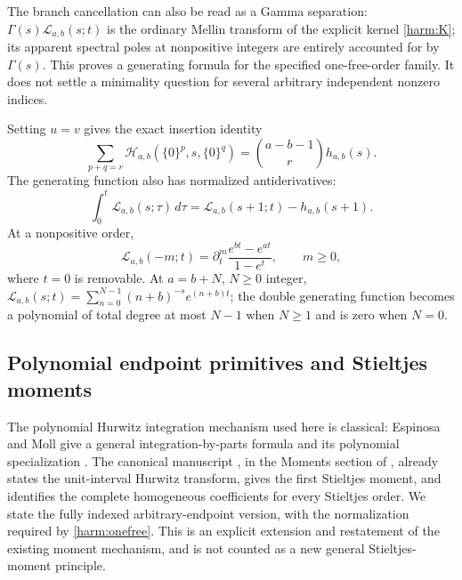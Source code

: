 The branch cancellation can also be read as a Gamma separation:
$\Gamma(s)\mathcal L_{a,b}(s;t)$ is the ordinary Mellin transform
of the explicit kernel \eqref{harm:K}; its apparent spectral poles at
nonpositive integers are entirely accounted for by $\Gamma(s)$.
This proves a generating formula for the specified one-free-order
family. It does not settle a minimality question for several arbitrary
independent nonzero indices.

Setting $u=v$ gives the exact insertion identity
\begin{equation}
 \sum_{p+q=r}\mathcal H_{a,b}(\{0\}^p,s,\{0\}^q)
                  =\binom{a-b-1}{r}h_{a,b}(s).
 \label{harm:diagonalzero}
\end{equation}
The generating function also has normalized antiderivatives:
\begin{equation}
 \int_0^t\mathcal L_{a,b}(s;\tau)\,d\tau
            =\mathcal L_{a,b}(s+1;t)-h_{a,b}(s+1).
 \label{harm:Lerchprimitive}
\end{equation}
At a nonpositive order,
\begin{equation}
 \mathcal L_{a,b}(-m;t)
      =\partial_t^m\frac{e^{bt}-e^{at}}{1-e^t},
 \qquad m\ge0,
 \label{harm:Lerchnegative}
\end{equation}
where $t=0$ is removable. At $a=b+N$, $N\ge0$ integer,
$\mathcal L_{a,b}(s;t)=\sum_{n=0}^{N-1}(n+b)^{-s}e^{(n+b)t}$;
the double generating function becomes a polynomial of total degree at
most $N-1$ when $N\ge1$ and is zero when $N=0$.

\subsection{Polynomial endpoint primitives and Stieltjes moments}

The polynomial Hurwitz integration mechanism used here is classical:
Espinosa and Moll give a general integration-by-parts formula and its
polynomial specialization \cite[Theorem~2.1 and Example~2.2]{harm:EM}.
The canonical manuscript \cite{source:manuscript}, in the Moments section
of , already states the unit-interval
Hurwitz transform, gives the first Stieltjes moment, and identifies the complete
homogeneous coefficients for every Stieltjes order. We state the fully
indexed arbitrary-endpoint version, with the normalization required by
\eqref{harm:onefree}. This is an explicit extension and restatement of
the existing moment mechanism, and is not counted as a new general
Stieltjes-moment principle.

